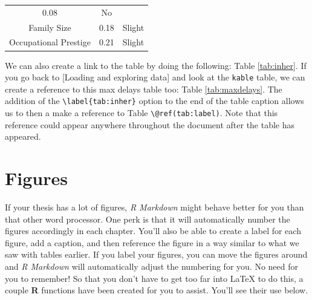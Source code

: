 \documentclass[12pt,twoside]{reedthesis}
\begin{document}
\begin{longtable}[c]{@{}ccc@{}}
\begin{minipage}[t]{0.47\columnwidth}
  0.08
  \strut\end{minipage} &
  \begin{minipage}[t]{0.16\columnwidth}\centering\strut
  No
  \strut\end{minipage}\tabularnewline
  \begin{minipage}[t]{0.29\columnwidth}\centering\strut
  Family Size
  \strut\end{minipage} &
  \begin{minipage}[t]{0.47\columnwidth}\centering\strut
  0.18
  \strut\end{minipage} &
  \begin{minipage}[t]{0.16\columnwidth}\centering\strut
  Slight
  \strut\end{minipage}\tabularnewline
  \begin{minipage}[t]{0.29\columnwidth}\centering\strut
  Occupational Prestige
  \strut\end{minipage} &
  \begin{minipage}[t]{0.47\columnwidth}\centering\strut
  0.21
  \strut\end{minipage} &
  \begin{minipage}[t]{0.16\columnwidth}\centering\strut
  Slight
  \strut\end{minipage}\tabularnewline
  \bottomrule
  \end{longtable}
  
  We can also create a link to the table by doing the following: Table
  \ref{tab:inher}. If you go back to {[}Loading and exploring data{]} and
  look at the \texttt{kable} table, we can create a reference to this max
  delays table too: Table \ref{tab:maxdelays}. The addition of the
  \texttt{\textbackslash{}label\{tab:inher\}} option to the end of the
  table caption allows us to then a make a reference to Table
  \texttt{\textbackslash{}@ref(tab:label)}. Note that this reference could
  appear anywhere throughout the document after the table has appeared.
  
  \clearpage
  
  \section{Figures}\label{figures}
  
  If your thesis has a lot of figures, \emph{R Markdown} might behave
  better for you than that other word processor. One perk is that it will
  automatically number the figures accordingly in each chapter. You'll
  also be able to create a label for each figure, add a caption, and then
  reference the figure in a way similar to what we saw with tables
  earlier. If you label your figures, you can move the figures around and
  \emph{R Markdown} will automatically adjust the numbering for you. No
  need for you to remember! So that you don't have to get too far into
  LaTeX to do this, a couple \textbf{R} functions have been created for
  you to assist. You'll see their use below.
  
\end{document}
